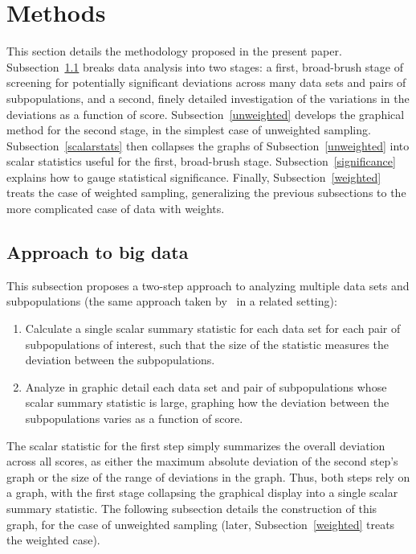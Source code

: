 \documentclass{article}
\begin{document}
\section{Methods}
\label{methods}

This section details the methodology proposed in the present paper.
Subsection~\ref{high-level} breaks data analysis into two stages:
a first, broad-brush stage of screening for potentially significant deviations
across many data sets and pairs of subpopulations,
and a second, finely detailed investigation of the variations
in the deviations as a function of score.
Subsection~\ref{unweighted} develops the graphical method
for the second stage, in the simplest case of unweighted sampling.
Subsection~\ref{scalarstats} then collapses the graphs
of Subsection~\ref{unweighted} into scalar statistics
useful for the first, broad-brush stage.
Subsection~\ref{significance} explains how to gauge statistical significance.
Finally, Subsection~\ref{weighted} treats the case of weighted sampling,
generalizing the previous subsections to the more complicated case
of data with weights.


\subsection{Approach to big data}
\label{high-level}

This subsection proposes a two-step approach to analyzing
multiple data sets and subpopulations (the same approach taken by~\cite{tygert}
in a related setting):
%
\begin{enumerate}
\item Calculate a single scalar summary statistic
for each data set for each pair of subpopulations of interest,
such that the size of the statistic
measures the deviation between the subpopulations.
\item Analyze in graphic detail each data set and pair of subpopulations
whose scalar summary statistic is large, graphing how the deviation
between the subpopulations varies as a function of score.
\end{enumerate}

The scalar statistic for the first step simply summarizes
the overall deviation across all scores,
as either the maximum absolute deviation of the second step's graph
or the size of the range of deviations in the graph.
Thus, both steps rely on a graph, with the first stage collapsing
the graphical display into a single scalar summary statistic.
The following subsection details the construction of this graph,
for the case of unweighted sampling (later, Subsection~\ref{weighted} treats
the weighted case).
\end{document}
